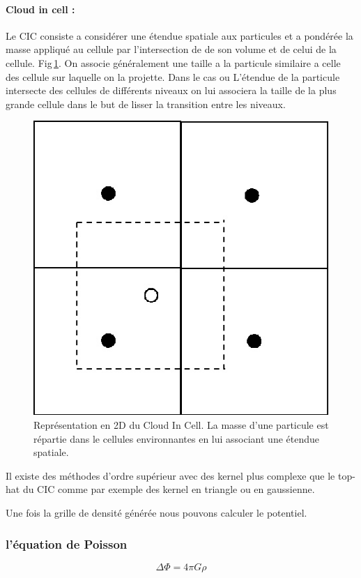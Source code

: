 \paragraph{Cloud in cell : } Le CIC consiste a considérer une étendue spatiale aux particules et a pondérée la masse appliqué au cellule par l'intersection de de son volume et de celui de la cellule.
Fig\,\ref{fig:CIC}.
On associe généralement une taille a la particule similaire a celle des cellule sur laquelle on la projette.
Dans le cas ou L’étendue de la particule intersecte des cellules de différents niveaux on lui associera la taille de la plus grande cellule dans le but de lisser la transition entre les niveaux.


\begin{figure}[bth]
		\centering
        \includegraphics[width=.5\linewidth]{img/02/CIC.jpg} 
        \caption{Représentation en 2D du Cloud In Cell. 
        La masse d'une particule est répartie dans le cellules environnantes en lui associant une étendue spatiale.
}
 		\label{fig:CIC}
\end{figure}

Il existe des méthodes d'ordre supérieur avec des kernel plus complexe que le top-hat du CIC comme par exemple des kernel en triangle ou en gaussienne.

Une fois la grille de densité générée nous pouvons calculer le potentiel.

\subsubsection{l'équation de Poisson}
\begin{equation}
\Delta \Phi = 4 \pi G \rho
\end{equation}

